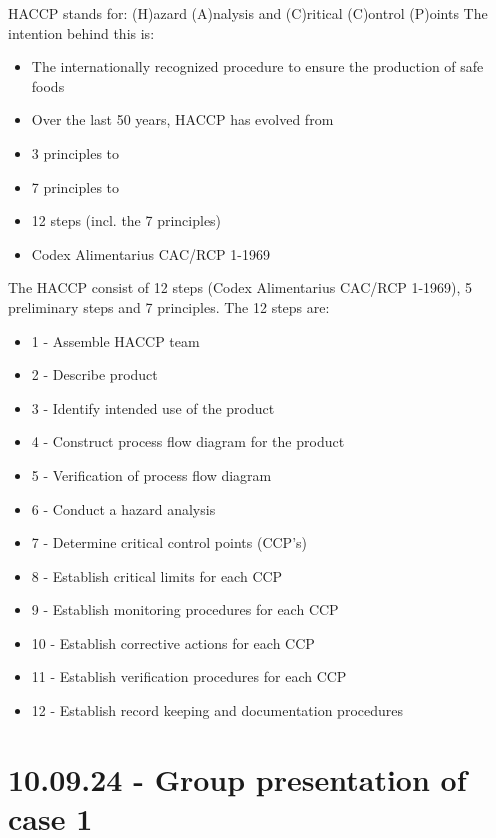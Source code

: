 HACCP stands for: (H)azard (A)nalysis and (C)ritical (C)ontrol (P)oints
The intention behind this is:

\begin{highlight}
    \begin{itemize}
        \item The internationally recognized procedure to ensure the production of safe foods
        \item Over the last 50 years, HACCP has evolved from
        \item 3 principles to
        \item 7 principles to
        \item 12 steps (incl. the 7 principles)
        \item Codex Alimentarius CAC/RCP 1-1969
    \end{itemize}
\end{highlight}

The HACCP consist of 12 steps (Codex Alimentarius CAC/RCP 1-1969), 5 preliminary steps and 7 principles. The 12 steps are:

\begin{highlight}
    \begin{itemize}
        \item 1 -  Assemble HACCP team
        \item 2 -  Describe product
        \item 3 -  Identify intended use of the product
        \item 4 -  Construct process flow diagram for the product
        \item 5 -  Verification of process flow diagram
        \item 6 -  Conduct a hazard analysis
        \item 7 -  Determine critical control points (CCP’s)
        \item 8 -  Establish critical limits for each CCP
        \item 9 -  Establish monitoring procedures for each CCP
        \item 10 - Establish corrective actions for each CCP
        \item 11 - Establish verification procedures for each CCP
        \item 12 - Establish record keeping and documentation procedures
    \end{itemize}
\end{highlight}

\section{10.09.24 - Group presentation of case 1}

